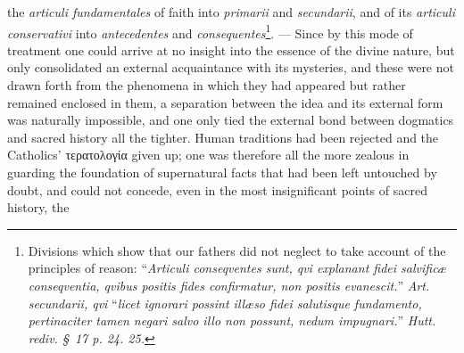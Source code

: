 \documentclass[12pt]{book}
\newcommand{\opage}[1]{\marginnote{\footnotesize\textit{[#1]}}}
\begin{document}
the \textit{articuli fundamentales} of faith into \textit{primarii} and
\textit{secundarii}, and of its \textit{articuli conservativi} into
\textit{antecedentes} and \textit{consequentes}\footnote{Divisions which show
that our fathers did not neglect to take account of the principles of
reason: ``\textit{Articuli \emph{conseqventes} sunt, qvi explanant fidei
salvificæ conseqventia, qvibus positis fides confirmatur, \emph{non positis}
evanescit.}'' \textit{Art. \emph{secundarii}, qvi} ``\textit{licet ignorari
possint illæso fidei salutisque fundamento, pertinaciter tamen negari salvo
illo non possunt, nedum impugnari.}'' \textit{Hutt. rediv. §~17 p. 24.
25.}}. --- Since by this mode of treatment one could arrive at no insight
into the essence of the divine nature, but only consolidated an external
acquaintance with its mysteries, and these were not drawn forth from the
phenomena in which they had appeared but rather remained enclosed in them, a
separation between the idea and its external form was naturally impossible,
and one only tied
\opage{80}\setcounter{footnote}{0}%
the external bond between dogmatics and sacred history all the tighter.
Human traditions had been rejected and the Catholics' τερατολογία given up;
one was therefore all the more zealous in guarding the foundation of
supernatural facts that had been left untouched by doubt, and could not
concede, even in the most insignificant points of sacred history, the
\end{document}
